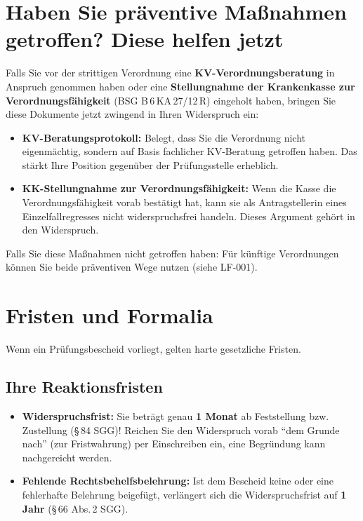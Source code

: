 \documentclass[a4paper]{umbruch-position}
\begin{document}
\newpage
\section{Haben Sie pr\"aventive Ma\ss{}nahmen getroffen? Diese helfen jetzt}

Falls Sie vor der strittigen Verordnung eine \textbf{KV-Verordnungsberatung} in Anspruch genommen haben oder eine \textbf{Stellungnahme der Krankenkasse zur Verordnungsf\"ahigkeit} (BSG B\,6\,KA\,27/12\,R) eingeholt haben, bringen Sie diese Dokumente jetzt zwingend in Ihren Widerspruch ein:

\begin{itemize}
    \item \textbf{KV-Beratungsprotokoll:} Belegt, dass Sie die Verordnung nicht eigenmächtig, sondern auf Basis fachlicher KV-Beratung getroffen haben. Das st\"arkt Ihre Position gegen\"uber der Pr\"ufungsstelle erheblich.
    \item \textbf{KK-Stellungnahme zur Verordnungsf\"ahigkeit:} Wenn die Kasse die Verordnungsf\"ahigkeit vorab best\"atigt hat, kann sie als Antragstellerin eines Einzelfallregresses nicht widerspruchsfrei handeln. Dieses Argument geh\"ort in den Widerspruch.
\end{itemize}

Falls Sie diese Ma\ss{}nahmen nicht getroffen haben: F\"ur k\"unftige Verordnungen k\"onnen Sie beide pr\"aventiven Wege nutzen (siehe LF-001).

\section{Fristen und Formalia}

Wenn ein Pr\"ufungsbescheid vorliegt, gelten harte gesetzliche Fristen.

\subsection*{Ihre Reaktionsfristen}
\begin{itemize}
    \item \textbf{Widerspruchsfrist:} Sie betr\"agt genau \textbf{1 Monat} ab Feststellung bzw. Zustellung (\S\,84 SGG)! Reichen Sie den Widerspruch vorab ``dem Grunde nach'' (zur Fristwahrung) per Einschreiben ein, eine Begr\"undung kann nachgereicht werden.
    \item \textbf{Fehlende Rechtsbehelfsbelehrung:} Ist dem Bescheid keine oder eine fehlerhafte Belehrung beigef\"ugt, verl\"angert sich die Widerspruchsfrist auf \textbf{1 Jahr} (\S\,66 Abs.\,2 SGG).
\end{itemize}
\end{document}
